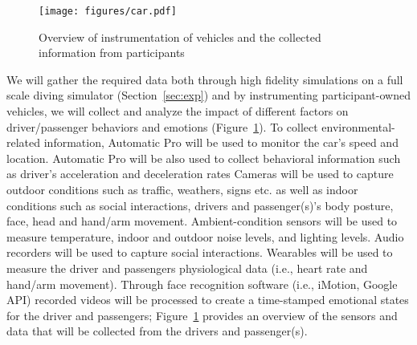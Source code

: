 \begin{figure}
    \centering
    \texttt{[image: figures/car.pdf]}
    \caption{Overview of instrumentation of vehicles and the collected information from participants}
    \label{fig:sensors}
\end{figure}
We will gather the required data both through high fidelity simulations on a full scale diving simulator (Section~\ref{sec:exp}) and by instrumenting participant-owned vehicles, we will collect and analyze the impact of different factors on driver/passenger behaviors and emotions (Figure~\ref{fig:sensors}).
To collect environmental-related information, Automatic Pro will be used to monitor the car's speed and location. 
Automatic Pro will be also used to collect behavioral information such as driver's acceleration and deceleration rates
Cameras will be used to capture outdoor conditions such as traffic, weathers, signs etc. as well as indoor conditions such as social interactions, drivers and passenger(s)'s body posture, face, head and hand/arm movement. 
Ambient-condition sensors will be used to measure temperature, indoor and outdoor noise levels, and lighting levels. 
Audio recorders will be used to capture social interactions. %
Wearables
 will be used to measure the driver and passengers physiological data (i.e., heart rate and hand/arm movement). Through face recognition software (i.e., iMotion, Google API) recorded videos will be processed to create a time-stamped emotional states for the driver and passengers; 
Figure~\ref{fig:sensors} provides an overview of the sensors and data that will be collected from the drivers and passenger(s).   


